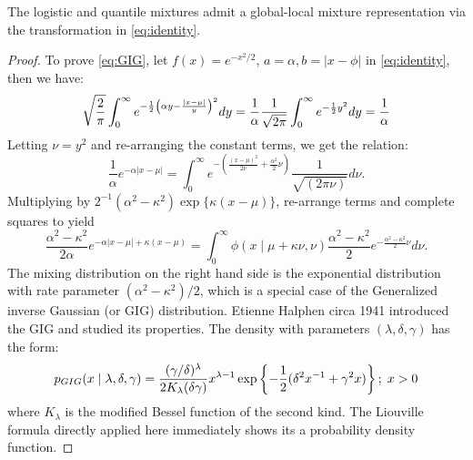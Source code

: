 \documentclass[lineno]{biometrika}
\begin{document}
\begin{lemma}
The logistic and quantile mixtures admit a global-local mixture representation via the \CS transformation in \eqref{eq:identity}. 
\end{lemma}
\begin{proof}
To prove \eqref{eq:GIG}, let $f(x) = e^{-x^2/2}$, $a = \alpha, b = |x-\phi|$ in \eqref{eq:identity}, then we have: 
$$
\sqrt{\frac{2}{\pi}} \int_{0}^{\infty} e^{-\frac{1}{2} \left(\alpha y - \frac{|x-\mu|}{y} \right)^2} dy = \frac{1}{\alpha}\frac{1}{\sqrt{2\pi}} \int_0^{\infty} e^{-\frac{1}{2} y^2} dy = \frac{1}{\alpha}
$$
Letting $\nu = y^2$ and re-arranging the constant terms, we get the relation:
$$
\frac{1}{\alpha} e^{-\alpha|x-\mu|} = \int_{0}^{\infty} e^{-\left( \frac{(x-\mu)^2}{2\nu} + \frac{\alpha^2}{2} \nu \right)} \frac{1}{\sqrt{(2\pi\nu)}} d\nu.
$$
Multiplying by $2^{-1}(\alpha^2-\kappa^2) \exp\{\kappa(x-\mu)\}$, re-arrange terms and complete squares to yield 
\begin{equation*}
  \frac{\alpha^2-\kappa^2}{2\alpha} e^{-\alpha|x-\mu| + \kappa(x-\mu)} = \int_0^{\infty} \phi(x \mid \mu + \kappa \nu, \nu) \frac{\alpha^2-\kappa^2}{2} e^{-\frac{\alpha^2-\kappa^2}{2} \nu} d \nu. 
\end{equation*}
The mixing distribution on the right hand side is the exponential distribution with rate parameter $(\alpha^2-\kappa^2)/2$, which is a special case of the Generalized inverse Gaussian (or GIG) distribution. Etienne Halphen circa 1941 \citep{seshadri1997halphen} introduced the GIG and \citet{barndorff1977infinite} studied its properties. The density with parameters $(\lambda, \delta, \gamma)$ has the form: 
$$
p_{GIG}(x \mid \lambda, \delta, \gamma) = \frac{(\gamma/\delta)^{\lambda}}{2K_{\lambda}(\delta \gamma)} x^{\lambda-1} \exp \left\{ -\frac{1}{2} (\delta^2 x^{-1} + 
\gamma^2 x )  \right\}; \; x > 0
$$
where $K_{\lambda}$ is the modified Bessel function of the second kind. The Liouville formula directly applied here immediately shows its a probability density function. 


\end{proof}
\end{document}
